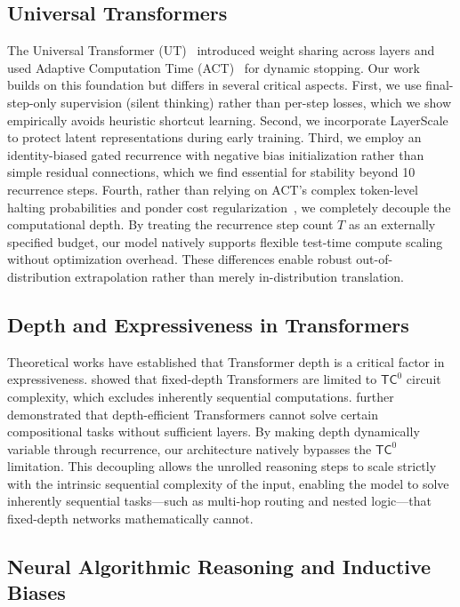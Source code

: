 \subsection{Universal Transformers}

The Universal Transformer (UT)~\citep{dehghani2018universal} introduced weight sharing across layers and used Adaptive Computation Time (ACT)~\citep{graves2016adaptive} for dynamic stopping. Our work builds on this foundation but differs in several critical aspects. First, we use final-step-only supervision (silent thinking) rather than per-step losses, which we show empirically avoids heuristic shortcut learning. Second, we incorporate LayerScale~\citep{touvron2021going} to protect latent representations during early training. Third, we employ an identity-biased gated recurrence with negative bias initialization rather than simple residual connections, which we find essential for stability beyond 10 recurrence steps. Fourth, rather than relying on ACT's complex token-level halting probabilities and ponder cost regularization~\citep{graves2016adaptive}, we completely decouple the computational depth. By treating the recurrence step count $T$ as an externally specified budget, our model natively supports flexible test-time compute scaling without optimization overhead. These differences enable robust out-of-distribution extrapolation rather than merely in-distribution translation.
 
\subsection{Depth and Expressiveness in Transformers}

Theoretical works have established that Transformer depth is a critical factor in expressiveness. \citet{merrill2023expresssive} showed that fixed-depth Transformers are limited to $\mathsf{TC}^0$ circuit complexity, which excludes inherently sequential computations. \citet{feng2023towards} further demonstrated that depth-efficient Transformers cannot solve certain compositional tasks without sufficient layers. By making depth dynamically variable through recurrence, our architecture natively bypasses the $\mathsf{TC}^0$ limitation. This decoupling allows the unrolled reasoning steps to scale strictly with the intrinsic sequential complexity of the input, enabling the model to solve inherently sequential tasks---such as multi-hop routing and nested logic---that fixed-depth networks mathematically cannot.
 
\subsection{Neural Algorithmic Reasoning and Inductive Biases}

